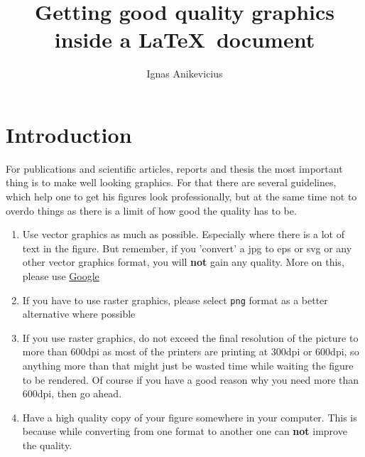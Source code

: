 

\usepackage[version=3]{mhchem}
\usepackage{float}
\usepackage{calc}
\usepackage[]{amsmath}

\usepackage[pdftex]{graphicx}
\graphicspath{{./figs/}}
\usepackage[update,verbose=false]{epstopdf}


\title{Getting good quality graphics inside a \LaTeX\ document}
\author{Ignas Anikevicius}



\maketitle

\section{Introduction}

For publications and scientific articles, reports and thesis the most important
thing is to make well looking graphics. For that there are several guidelines,
which help one to get his figures look professionally, but at the same time not
to overdo things as there is a limit of how good the quality has to be.

\begin{enumerate}
    \item Use vector graphics as much as possible. Especially where there is a
        lot of text in the figure. But remember, if you 'convert' a jpg to eps
        or svg or any other vector graphics format, you will \textbf{not} gain
        any quality. More on this, please use
        \href{http://www.google.co.uk}{Google}
    \item If you have to use raster graphics, please select \verb|png| format as
        a better alternative where possible
    \item If you use raster graphics, do not exceed the final resolution of the
        picture to more than 600dpi as most of the printers are printing at
        300dpi or 600dpi, so anything more than that might just be wasted time
        while waiting the figure to be rendered. Of course if you have a good
        reason why you need more than 600dpi, then go ahead.
    \item Have a high quality copy of your figure somewhere in your computer.
        This is because while converting from one format to another one can
        \textbf{not} improve the quality.
\end{enumerate}


